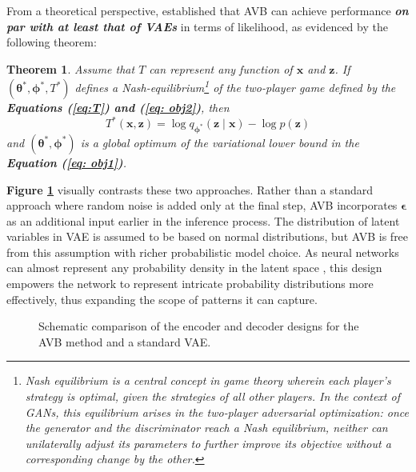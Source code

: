 \documentclass[a4paper,12pt]{article}
\theoremstyle{plain} %
\newtheorem{theorem}{Theorem}[section] %
\theoremstyle{remark} %
\theoremstyle{definition} %
\begin{document}
From a theoretical perspective, \citet{mescheder2017adversarial} established that AVB can achieve performance \textit{\textbf{on par with at least that of VAEs}} in terms of likelihood, as evidenced by the following theorem:
\begin{theorem}\label{thm:T_2}
    Assume that $T$ can represent any function of $\bm{x}$ and $\bm{z}$. If $(\bm{\theta}^*,\bm{\phi}^*,T^*)$ defines a Nash-equilibrium\footnote{Nash equilibrium is a central concept in game theory wherein each player’s strategy is optimal, given the strategies of all other players. In the context of GANs, this equilibrium arises in the two‐player adversarial optimization: once the generator and the discriminator reach a Nash equilibrium, neither can unilaterally adjust its parameters to further improve its objective without a corresponding change by the other.} of the two-player game defined by the \textbf{Equations (\ref{eq:T}) and (\ref{eq: obj2})}, then
    \begin{equation}\label{eq:opt_T}
        T^*(\bm{x},\bm{z})=\log q_{\bm{\phi}^*}(\bm{z}\mid\bm{x}) - \log p(\bm{z})
    \end{equation}
    and $(\bm{\theta}^*,\bm{\phi}^*)$ is a global optimum of the variational lower bound in the \textbf{Equation (\ref{eq: obj1})}.
\end{theorem}
\textbf{Figure \ref{fig:comp_avb_vae}} visually contrasts these two approaches. Rather than a standard approach where random noise is added only at the final step, AVB incorporates $\bm{\epsilon}$ as an additional input earlier in the inference process. The distribution of latent variables in VAE is assumed to be based on normal distributions, but AVB is free from this assumption with richer probabilistic model choice. As neural networks can almost represent any probability density in the latent space \citep{cybenko1989approximation}, this design empowers the network to represent intricate probability distributions more effectively, thus expanding the scope of patterns it can capture.
\begin{figure}[!htb]
    \centering


    \caption{Schematic comparison of the encoder and decoder designs for the AVB method and a standard VAE.}
    \label{fig:comp_avb_vae}
\end{figure}
\end{document}
